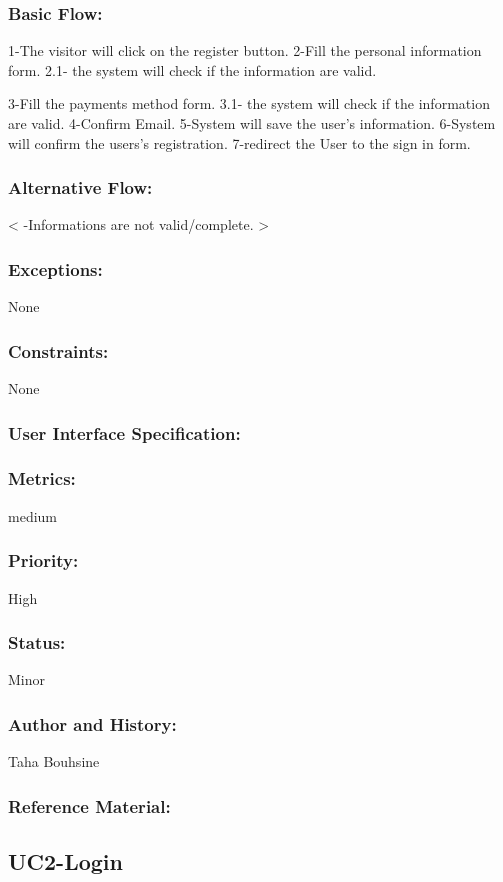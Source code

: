 \documentclass[11pt, openany]{report}
\begin{document}
\subsubsection{Basic Flow:}
1-The visitor will click on the register button.
2-Fill the personal information form.
  2.1- the system will check if the information are valid.

3-Fill the payments method form.
  3.1- the system will check if the information are valid.
4-Confirm Email.
5-System will save the user's information.
6-System will confirm the users's registration.
7-redirect the User to the sign in form.
\subsubsection{Alternative Flow:}
< -Informations are not valid/complete. >
\subsubsection{Exceptions:}
None
\subsubsection{Constraints:}
None
\subsubsection{User Interface Specification:}
\subsubsection{Metrics:}
medium
\subsubsection{Priority:}
High
\subsubsection{Status:}
Minor
\subsubsection{Author and History:}
Taha Bouhsine
\subsubsection{Reference Material:}


\subsection{UC2-Login}
\label{UC2}
\end{document}
